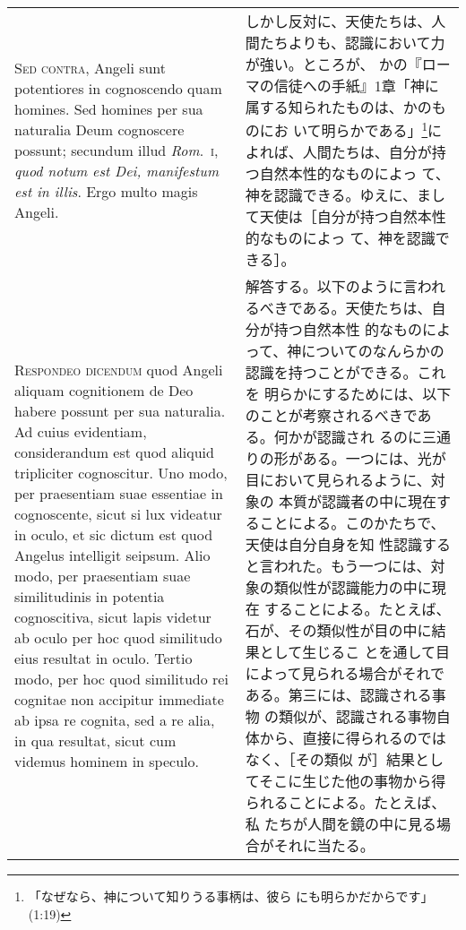 \documentclass[10pt]{jsarticle} %
\begin{document}
\begin{longtable}{p{21em}p{21em}}
\\


{\scshape  Sed contra}, Angeli sunt potentiores in
cognoscendo quam homines. Sed homines per sua naturalia Deum cognoscere
possunt; secundum illud {\itshape Rom}.~{\scshape i}, {\itshape quod notum est Dei, manifestum est in
illis}. Ergo multo magis Angeli.


&


しかし反対に、天使たちは、人間たちよりも、認識において力が強い。ところが、
かの『ローマの信徒への手紙』1章「神に属する知られたものは、かのものにお
 いて明らかである」\footnote{「なぜなら、神について知りうる事柄は、彼ら
 にも明らかだからです」(1:19)}によれば、人間たちは、自分が持つ自然本性的なものによっ
 て、神を認識できる。ゆえに、まして天使は［自分が持つ自然本性的なものによっ
 て、神を認識できる］。

\\


{\scshape Respondeo dicendum} quod Angeli aliquam
cognitionem de Deo habere possunt per sua naturalia. Ad cuius
evidentiam, considerandum est quod aliquid tripliciter cognoscitur. Uno
modo, per praesentiam suae essentiae in cognoscente, sicut si lux
videatur in oculo, et sic dictum est quod Angelus intelligit
seipsum. Alio modo, per praesentiam suae similitudinis in potentia
cognoscitiva, sicut lapis videtur ab oculo per hoc quod similitudo eius
resultat in oculo. Tertio modo, per hoc quod similitudo rei cognitae non
accipitur immediate ab ipsa re cognita, sed a re alia, in qua resultat,
sicut cum videmus hominem in speculo. 


&


解答する。以下のように言われるべきである。天使たちは、自分が持つ自然本性
 的なものによって、神についてのなんらかの認識を持つことができる。これを
 明らかにするためには、以下のことが考察されるべきである。何かが認識され
 るのに三通りの形がある。一つには、光が目において見られるように、対象の
 本質が認識者の中に現在することによる。このかたちで、天使は自分自身を知
 性認識すると言われた。もう一つには、対象の類似性が認識能力の中に現在
 することによる。たとえば、石が、その類似性が目の中に結果として生じるこ
 とを通して目によって見られる場合がそれである。第三には、認識される事物
 の類似が、認識される事物自体から、直接に得られるのではなく、［その類似
 が］結果としてそこに生じた他の事物から得られることによる。たとえば、私
 たちが人間を鏡の中に見る場合がそれに当たる。


\\




\end{longtable}
\end{document}
